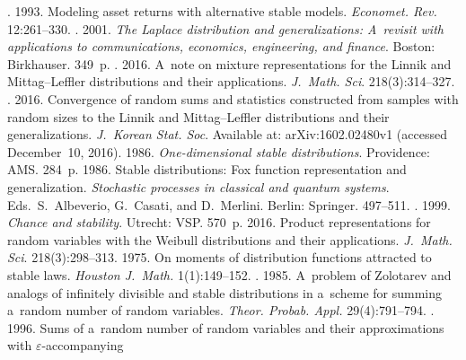   \begin{multicols}{2}

\renewcommand{\bibname}{\protect\rmfamily References}

{\small\frenchspacing
 {%
 \begin{thebibliography}{99}

. 1993. Modeling asset returns with alternative 
stable models. \textit{Economet. Rev.} 12:261--330.
. 2001. \textit{The 
Laplace distribution and generalizations: A~revisit with applications to communications, 
economics, engineering, and finance}. Boston: Birkhauser. 349~p. 
. 2016. 
A~note on mixture representations for the Linnik and Mittag--Leffler 
distributions and their applications. \textit{J.~Math. Sci}. 218(3):314--327. 
. 2016. Convergence of random
sums and statistics constructed 
from samples with random sizes to the Linnik and Mittag--Leffler distributions and 
their generalizations. \textit{J.~Korean Stat. Soc}. 
Available at: arXiv:1602.02480v1 (accessed December~10, 2016). 
 1986. \textit{One-dimensional stable distributions}. 
Providence: AMS. 284~p.
 1986. Stable distributions: Fox function representation and 
generalization. \textit{Stochastic processes in classical and quantum systems}. 
Eds.\ S.~Albeverio, G.~Casati, and D.~Merlini. Berlin: Springer.  497--511. 
. 1999. 
\textit{Chance and stability}. Utrecht: VSP. 570~p. 
 2016. Product representations for random variables with the 
Weibull distributions and their applications. \textit{J.~Math. Sci}. 218(3):298--313. 
 1975. On moments of distribution functions attracted to stable laws. 
\textit{Houston J.~Math.} 1(1):149--152. 
. 1985. 
A~problem of Zolotarev and analogs of infinitely 
divisible and stable distributions in a~scheme for summing a~random 
number of random variables. \textit{Theor. Probab. Appl.} 29(4):791--794.
. 1996. Sums of a~random number 
of random variables and their approximations with $\varepsilon$-accompanying 

\end{thebibliography}}}
\end{multicols}
